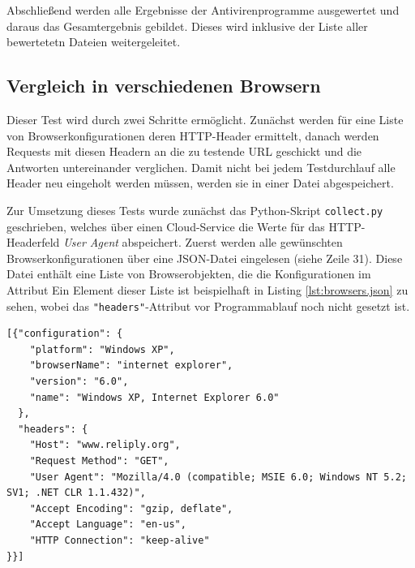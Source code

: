 Abschließend werden alle Ergebnisse der Antivirenprogramme ausgewertet und daraus das Gesamtergebnis gebildet. Dieses wird inklusive der Liste aller bewertetetn Dateien weitergeleitet.

\subsection{Vergleich in verschiedenen Browsern}

Dieser Test wird durch zwei Schritte ermöglicht.
Zunächst werden für eine Liste von Browserkonfigurationen deren \acs{HTTP}-Header ermittelt, danach werden Requests mit diesen Headern an die zu testende \acs{URL} geschickt und die Antworten untereinander verglichen.
Damit nicht bei jedem Testdurchlauf alle Header neu eingeholt werden müssen, werden sie in einer Datei abgespeichert.

Zur Umsetzung dieses Tests wurde zunächst das Python-Skript \lstinline[style=eclipse]{collect.py} geschrieben, welches über einen Cloud-Service die Werte für das \acs{HTTP}-Headerfeld \textit{User Agent} abspeichert.
Zuerst werden alle gewünschten Browserkonfigurationen über eine \ac{JSON}-Datei eingelesen (siehe
Zeile 31).
Diese Datei enthält eine Liste von Browserobjekten, die die Konfigurationen im Attribut
Ein Element dieser Liste ist beispielhaft in Listing \ref{lst:browsers.json} zu sehen, wobei das
\lstinline[style=eclipse]{"headers"}-Attribut vor Programmablauf noch nicht gesetzt ist.

\newpage

\begin{scriptsize}
\begin{lstlisting}
[{"configuration": {
    "platform": "Windows XP",
    "browserName": "internet explorer",
    "version": "6.0",
    "name": "Windows XP, Internet Explorer 6.0"
  },
  "headers": {
    "Host": "www.reliply.org",
    "Request Method": "GET",
    "User Agent": "Mozilla/4.0 (compatible; MSIE 6.0; Windows NT 5.2; SV1; .NET CLR 1.1.432)",
    "Accept Encoding": "gzip, deflate",
    "Accept Language": "en-us",
    "HTTP Connection": "keep-alive"
}}]
\end{lstlisting}
\end{scriptsize}

